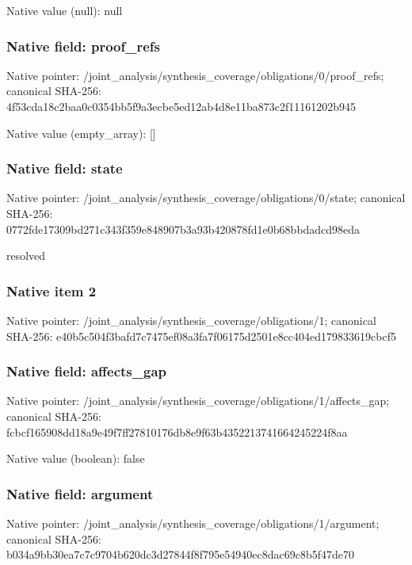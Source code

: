 \documentclass[10pt,a4paper]{article}
\begin{document}
Native value (null): null

\subsubsection{Native field: proof\_\allowbreak{}refs}
Native pointer: /joint\_\allowbreak{}analysis/synthesis\_\allowbreak{}coverage/obligations/0/proof\_\allowbreak{}refs; canonical SHA-256: 4f53cda18c2baa0c0354bb5f9a3ecbe5ed12ab4d8e11ba873c2f11161202b945

Native value (empty\_\allowbreak{}array): []

\subsubsection{Native field: state}
Native pointer: /joint\_\allowbreak{}analysis/synthesis\_\allowbreak{}coverage/obligations/0/state; canonical SHA-256: 0772fde17309bd271c343f359e848907b3a93b420878fd1e0b68bbdadcd98eda

\begingroup\raggedright\sloppy resolved\par\endgroup

\subsubsection{Native item 2}
Native pointer: /joint\_\allowbreak{}analysis/synthesis\_\allowbreak{}coverage/obligations/1; canonical SHA-256: e40b5c504f3bafd7c7475ef08a3fa7f06175d2501e8cc404ed179833619cbcf5

\subsubsection{Native field: affects\_\allowbreak{}gap}
Native pointer: /joint\_\allowbreak{}analysis/synthesis\_\allowbreak{}coverage/obligations/1/affects\_\allowbreak{}gap; canonical SHA-256: fcbcf165908dd18a9e49f7ff27810176db8e9f63b4352213741664245224f8aa

Native value (boolean): false

\subsubsection{Native field: argument}
Native pointer: /joint\_\allowbreak{}analysis/synthesis\_\allowbreak{}coverage/obligations/1/argument; canonical SHA-256: b034a9bb30ea7c7c9704b620dc3d27844f8f795e54940ec8dac69c8b5f47de70
\end{document}
